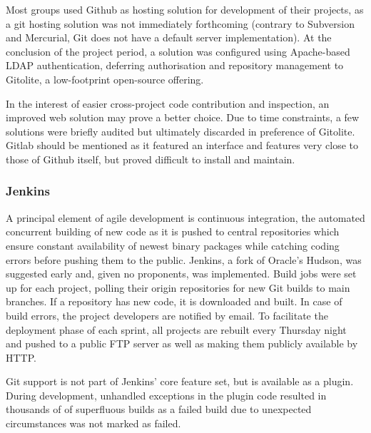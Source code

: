 Most groups used Github as hosting solution for development of their projects, as a git hosting solution was not immediately forthcoming (contrary to Subversion and Mercurial, Git does not have a default server implementation). At the conclusion of the project period, a solution was configured using Apache-based LDAP authentication, deferring authorisation and repository management to Gitolite, a low-footprint open-source offering.

In the interest of easier cross-project code contribution and inspection, an improved web solution may prove a better choice. Due to time constraints, a few solutions were briefly audited but ultimately discarded in preference of Gitolite. Gitlab should be mentioned as it featured an interface and features very close to those of Github itself, but proved difficult to install and maintain.


\subsubsection{Jenkins}
\label{subsub:jenkins}
A principal element of agile development is continuous integration, the automated concurrent building of new code as it is pushed to central repositories which ensure constant availability of newest binary packages while catching coding errors before pushing them to the public. Jenkins, a fork of Oracle's Hudson, was suggested early and, given no proponents, was implemented. Build jobs were set up for each project, polling their origin repositories for new Git builds to main branches. If a repository has new code, it is downloaded and built. In case of build errors, the project developers are notified by email. To facilitate the deployment phase of each sprint, all projects are rebuilt every Thursday night and pushed to a public FTP server as well as making them publicly available by HTTP.

Git support is not part of Jenkins' core feature set, but is available as a plugin. During development, unhandled exceptions in the plugin code resulted in thousands of of superfluous builds as a failed build due to unexpected circumstances was not marked as failed.


